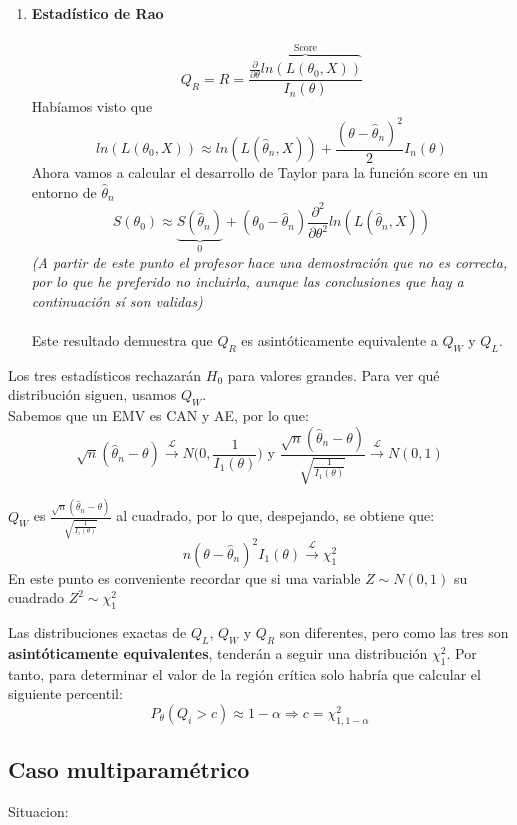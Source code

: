 \begin{enumerate}
    \item \textbf{Estadístico de Rao}\\\ \\
    $$Q_R=R=\frac{\overbrace{\frac{\partial}{\partial\theta}ln(L(\theta_0,X))}^{\text{Score}}}{I_n(\theta)}$$
    Habíamos visto que 
    $$ln(L(\theta_0,X))\approx ln(L(\hat\theta_n,X))+\frac{(\theta-\hat\theta_n)^2}{2}I_n(\theta)$$
    Ahora vamos a calcular el desarrollo de Taylor para la función score en un entorno de $\hat\theta_n$
    $$S(\theta_0)\approx \underbrace{S(\hat\theta_n)}_{0}+(\theta_0-\hat\theta_n)\frac{\partial^2}{\partial\theta^2}ln(L(\hat\theta_n,X))$$
    \textit{(A partir de este punto el profesor hace una demostración que no es correcta, por lo que he preferido no incluirla, aunque las conclusiones que hay a continuación sí son validas)}\\\ \\
    Este resultado demuestra que $Q_R$ es asintóticamente equivalente a $Q_W$ y $Q_L$. 
\end{enumerate}

Los tres estadísticos rechazarán $H_0$ para valores grandes. Para ver qué distribución siguen, usamos $Q_W$.\\
Sabemos que un EMV es CAN y AE, por lo que:
$$\sqrt{n}(\hat\theta_n-\theta)\overset{\mathcal{L}}{\longrightarrow}N\Big(0,\frac{1}{I_1(\theta)}\Big)\text{ y }\frac{\sqrt{n}(\hat\theta_n-\theta)}{\sqrt{\frac{1}{I_1(\theta)}}}\overset{\mathcal{L}}{\longrightarrow}N(0,1)$$

$Q_W$ es $\displaystyle\frac{\sqrt{n}(\hat\theta_n-\theta)}{\sqrt{\frac{1}{I_1(\theta)}}}$ al cuadrado, por lo que, despejando, se obtiene que:
$$n(\theta-\hat\theta_n)^2I_1(\theta)\overset{\mathcal{L}}{\longrightarrow}\chi^2_1$$
En este punto es conveniente recordar que si una variable $Z\sim N(0,1)$ su cuadrado $Z^2\sim \chi^2_1$

Las distribuciones exactas de $Q_L$, $Q_W$ y $Q_R$ son diferentes, pero como las tres son \textbf{asintóticamente equivalentes}, tenderán a seguir una distribución $\chi^2_1$. 
Por tanto, para determinar el valor de la región crítica solo habría que calcular el siguiente percentil:
$$P_{\theta}(Q_i>c)\approx 1-\alpha\Longrightarrow  c=\chi^2_{1,1-\alpha}$$

\subsection{Caso multiparamétrico}

Situacion:

